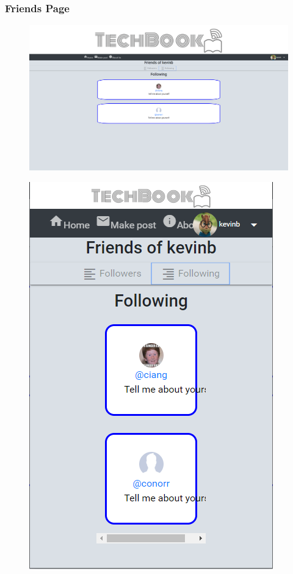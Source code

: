 \subsubsection{Friends Page}
\begin{figure}[H]
\centering
\begin{minipage}{.75\textwidth}
  \centering
  \includegraphics[width=.9\linewidth]{img/ui/followPC.PNG}
  \label{fig:followPC}
\end{minipage}%
\begin{minipage}{.25\textwidth}
  \centering
  \includegraphics[width=.9\linewidth]{img/ui/followMOBILE.PNG}
  \label{fig:followMOBILE}
\end{minipage}
\end{figure}

